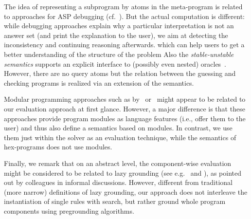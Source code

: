 \documentclass[11pt,fleqn,twoside]{article}
\newcommand\hex{{\sc hex}\xspace}
\newcommand{\p}{\ensuremath{\mathsf{P}}\xspace}
\newcommand{\up}{\ensuremath{\mathsf{UP}}\xspace}
\newcommand{\np}{\ensuremath{\mathsf{NP}}\xspace}
\begin{document}
		The idea of representing a subprogram by atoms in the meta-program is related to approaches for ASP debugging (cf.~).
		But the actual computation is different: while debugging approaches explain why a particular interpretation is not an answer set
		(and print the explanation to the user), we aim at detecting the inconsistency and continuing reasoning afterwards.
		which can help users to get a better understanding of the structure of the problem	
		Also the \emph{stable-unstable semantics} supports an explicit interface to (possibly even nested) oracles~\cite{DBLP:journals/tplp/BogaertsJT16}.
		However, there are no query atoms but the relation between the guessing and checking programs is realized via an extension of the semantics.

		Modular programming approaches such as by~ or~
		might appear to be related to our evaluation approach at first glance. However, a major difference is that these approaches provide program modules
		as language features (i.e., offer them to the user) and thus also define a semantics based on modules. In contrast, we use them just within the solver
		as an evaluation technique, while the semantics of \hex-programs does not use modules.
		
		Finally, we remark that on an abstract level, the component-wise evaluation might be considered to
		be related to lazy grounding (see e.g.~ and ),
		as pointed out by colleagues in informal discussions. However, different from traditional (more narrow) definitions of lazy grounding,
		our approach does not interleave the instantiation of single rules with search, but rather ground whole program components using pregrounding algorithms.
		
\end{document}
